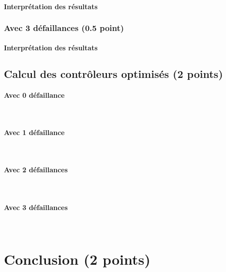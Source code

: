 \documentclass[a4paper]{book}
\begin{document}
\paragraph{Interprétation des résultats}

\subsubsection{Avec 3 défaillances (0.5 point)}




%
\paragraph{Interprétation des résultats}

\subsection{Calcul des contrôleurs optimisés (2 points)}
\paragraph{Avec 0 défaillance}\ \\


\paragraph{Avec 1 défaillance}\ \\


\paragraph{Avec 2 défaillances}\ \\


\paragraph{Avec 3 défaillances}\ \\


\section{Conclusion (2 points)}
\end{document}
